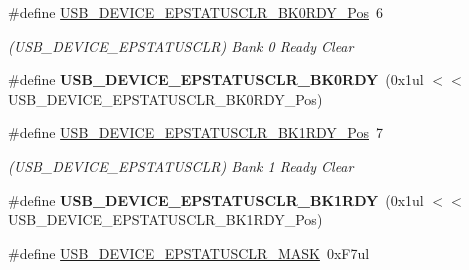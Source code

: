 \begin{DoxyCompactItemize}
\item 
\hypertarget{group___s_a_m_l21___u_s_b_ga6d823c951952fea7e08cea525d879ea8}{}\#define \hyperlink{group___s_a_m_l21___u_s_b_ga6d823c951952fea7e08cea525d879ea8}{U\+S\+B\+\_\+\+D\+E\+V\+I\+C\+E\+\_\+\+E\+P\+S\+T\+A\+T\+U\+S\+C\+L\+R\+\_\+\+B\+K0\+R\+D\+Y\+\_\+\+Pos}~6\label{group___s_a_m_l21___u_s_b_ga6d823c951952fea7e08cea525d879ea8}

\begin{DoxyCompactList}\small\item\em (U\+S\+B\+\_\+\+D\+E\+V\+I\+C\+E\+\_\+\+E\+P\+S\+T\+A\+T\+U\+S\+C\+L\+R) Bank 0 Ready Clear \end{DoxyCompactList}\item 
\hypertarget{group___s_a_m_l21___u_s_b_ga9be84689ce75f5bcedcd05e9e2f148d0}{}\#define {\bfseries U\+S\+B\+\_\+\+D\+E\+V\+I\+C\+E\+\_\+\+E\+P\+S\+T\+A\+T\+U\+S\+C\+L\+R\+\_\+\+B\+K0\+R\+D\+Y}~(0x1ul $<$$<$ U\+S\+B\+\_\+\+D\+E\+V\+I\+C\+E\+\_\+\+E\+P\+S\+T\+A\+T\+U\+S\+C\+L\+R\+\_\+\+B\+K0\+R\+D\+Y\+\_\+\+Pos)\label{group___s_a_m_l21___u_s_b_ga9be84689ce75f5bcedcd05e9e2f148d0}

\item 
\hypertarget{group___s_a_m_l21___u_s_b_ga6528b261f4ba46192c788d7a2641557a}{}\#define \hyperlink{group___s_a_m_l21___u_s_b_ga6528b261f4ba46192c788d7a2641557a}{U\+S\+B\+\_\+\+D\+E\+V\+I\+C\+E\+\_\+\+E\+P\+S\+T\+A\+T\+U\+S\+C\+L\+R\+\_\+\+B\+K1\+R\+D\+Y\+\_\+\+Pos}~7\label{group___s_a_m_l21___u_s_b_ga6528b261f4ba46192c788d7a2641557a}

\begin{DoxyCompactList}\small\item\em (U\+S\+B\+\_\+\+D\+E\+V\+I\+C\+E\+\_\+\+E\+P\+S\+T\+A\+T\+U\+S\+C\+L\+R) Bank 1 Ready Clear \end{DoxyCompactList}\item 
\hypertarget{group___s_a_m_l21___u_s_b_gaa8e450fe7b9645333a9984ebbf211e71}{}\#define {\bfseries U\+S\+B\+\_\+\+D\+E\+V\+I\+C\+E\+\_\+\+E\+P\+S\+T\+A\+T\+U\+S\+C\+L\+R\+\_\+\+B\+K1\+R\+D\+Y}~(0x1ul $<$$<$ U\+S\+B\+\_\+\+D\+E\+V\+I\+C\+E\+\_\+\+E\+P\+S\+T\+A\+T\+U\+S\+C\+L\+R\+\_\+\+B\+K1\+R\+D\+Y\+\_\+\+Pos)\label{group___s_a_m_l21___u_s_b_gaa8e450fe7b9645333a9984ebbf211e71}

\item 
\hypertarget{group___s_a_m_l21___u_s_b_ga7541bd01b67281f768176f2d0e03cd97}{}\#define \hyperlink{group___s_a_m_l21___u_s_b_ga7541bd01b67281f768176f2d0e03cd97}{U\+S\+B\+\_\+\+D\+E\+V\+I\+C\+E\+\_\+\+E\+P\+S\+T\+A\+T\+U\+S\+C\+L\+R\+\_\+\+M\+A\+S\+K}~0x\+F7ul\label{group___s_a_m_l21___u_s_b_ga7541bd01b67281f768176f2d0e03cd97}


\end{DoxyCompactItemize}
